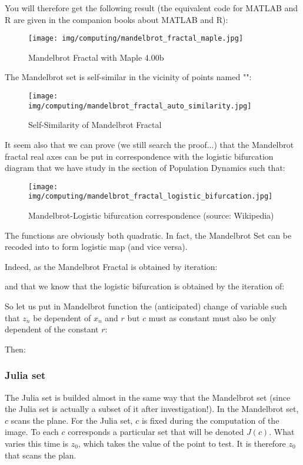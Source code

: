 	You will therefore get the following result (the equivalent code for MATLAB and R are given in the companion books about MATLAB and R):
	\begin{figure}[H]
		\centering
		\texttt{[image: img/computing/mandelbrot\_fractal\_maple.jpg]}
		\caption{Mandelbrot Fractal with Maple 4.00b}
	\end{figure}
	The Mandelbrot set is self-similar in the vicinity of points named "":
	\begin{figure}[H]
		\centering
		\texttt{[image: img/computing/mandelbrot\_fractal\_auto\_similarity.jpg]}
		\caption{Self-Similarity of Mandelbrot Fractal}
	\end{figure}
	It seem also that we can prove (we still search the proof...) that the Mandelbrot fractal real axes can be put in correspondence with the logistic bifurcation diagram that we have study in the section of Population Dynamics such that:
	\begin{figure}[H]
		\centering
		\texttt{[image: img/computing/mandelbrot\_fractal\_logistic\_bifurcation.jpg]}
		\caption{Mandelbrot-Logistic bifurcation correspondence (source: Wikipedia)}
	\end{figure}
	The functions are obviously both quadratic. In fact, the Mandelbrot Set can be recoded into to form logistic map (and vice versa).
	
	Indeed, as the Mandelbrot Fractal is obtained by iteration:
	
	and that we know that the logistic bifurcation is obtained by the iteration of:
	
	So let us put in Mandelbrot function the (anticipated) change of variable such that $z_n$ be dependent of $x_n$ and $r$ but $c$ must as constant must also be only dependent of the constant $r$:
	
	Then:
	
	
	\subsubsection{Julia set}
	The Julia set is builded almost in the same way that the Mandelbrot set (since the Julia set is actually a subset of it after investigation!). In the Mandelbrot set, $c$ scans the plane. For the Julia set, $c$ is fixed during the computation of the image. To each $c$ corresponds a particular set that will be denoted $J(c)$. What varies this time is $z_0$, which takes the value of the point to test. It is therefore $z_0$ that scans the plan.
	
